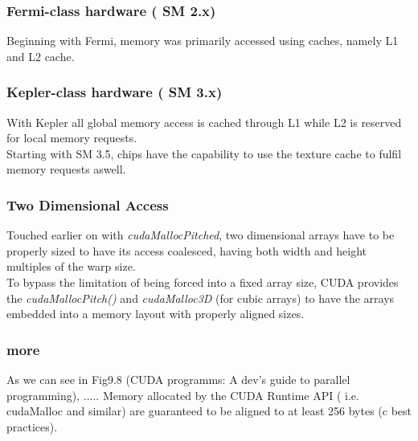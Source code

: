 \subsubsection{Fermi-class hardware ( SM 2.x)}
Beginning with Fermi, memory was primarily accessed using caches, namely L1 and L2 cache.\\
\subsubsection{Kepler-class hardware ( SM 3.x)}
With Kepler all global memory access is cached through L1 while L2 is reserved for local memory requests.\\
Starting with SM 3.5, chips have the capability to use the texture cache to fulfil memory requests aswell.\\
\subsubsection{Two Dimensional Access}
Touched earlier on with \emph{cudaMallocPitched}, two dimensional arrays have to be properly sized to have its access coalesced, having both width and height multiples of the warp size.\\
To bypass the limitation of being forced into a fixed array size, CUDA provides the \emph{cudaMallocPitch()} and \emph{cudaMalloc3D} (for cubic arrays) to have the arrays embedded into a memory layout with properly aligned sizes.
\subsubsection{more}
As we can see in Fig9.8 (CUDA programms: A dev's guide to parallel programming), .....
Memory allocated by the CUDA Runtime API ( i.e. cudaMalloc and similar) are guaranteed to be aligned to at least 256 bytes (c best practices).\\
